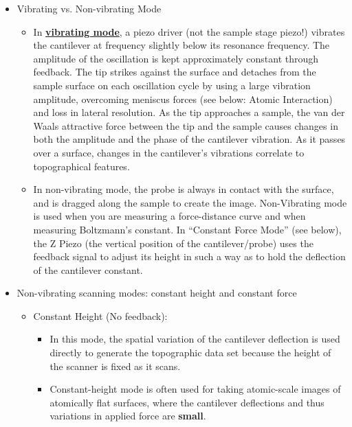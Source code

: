 \documentclass{../lab}
\begin{document}
\begin{itemize}
    \item Vibrating vs. Non-vibrating Mode

    \begin{itemize}
        \item In \href{http://experimentationlab.berkeley.edu/sites/default/files/AFMImages/7.2.\%20tip\%20sample\%20Vibrating.flv\_converted.mp4}{\textbf{vibrating mode}}, a piezo driver (not the sample stage piezo!) vibrates the cantilever at frequency slightly below its resonance frequency. The amplitude of the oscillation is kept approximately constant through feedback.  The tip strikes against the surface and detaches from the sample surface on each oscillation cycle by using a large vibration amplitude, overcoming meniscus forces (see below: Atomic Interaction) and loss in lateral resolution.  As the tip approaches a sample, the van der Waals attractive force between the tip and the sample causes changes in both the amplitude and the phase of the cantilever vibration.  As it passes over a surface, changes in the cantilever's vibrations correlate to topographical features.

        \item In non-vibrating mode, the probe is always in contact with the surface, and is dragged along the sample to create the image.  Non-Vibrating mode is used when you are measuring a force-distance curve and when measuring Boltzmann's constant. In ``Constant Force Mode'' (see below), the Z Piezo (the vertical position of the cantilever/probe) uses the feedback signal to adjust its height in such a way as to hold the deflection of the cantilever constant.
    \end{itemize}

    \item Non-vibrating scanning modes: constant height and constant force

    \begin{itemize}
        \item Constant Height (No feedback):

        \begin{itemize}
            \item In this mode, the spatial variation of the cantilever deflection is used directly to generate the topographic data set because the height of the scanner is fixed as it scans.

            \item Constant-height mode is often used for taking atomic-scale images of atomically flat surfaces, where the cantilever deflections and thus variations in applied force are \textbf{small}.


\end{itemize}
\end{itemize}
\end{itemize}
\end{document}
